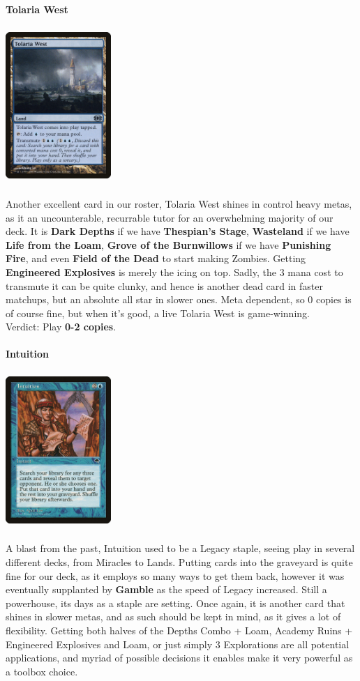 \documentclass{report}
\begin{document}
\textbf{Tolaria West}
\begin{center}
\includegraphics [width = 4cm, height = 6cm] {tolaria-west}
\end{center}
Another excellent card in our roster, Tolaria West shines in control heavy metas, as it an uncounterable, recurrable tutor for an overwhelming majority of our deck. It is \textbf{Dark Depths} if we have \textbf{Thespian's Stage}, \textbf{Wasteland} if we have \textbf{Life from the Loam}, \textbf{Grove of the Burnwillows} if we have \textbf{Punishing Fire}, and even \textbf{Field of the Dead} to start making Zombies. Getting \textbf{Engineered Explosives} is merely the icing on top. Sadly, the 3 mana cost to transmute it can be quite clunky, and hence is another dead card in faster matchups, but an absolute all star in slower ones. Meta dependent, so 0 copies is of course fine, but when it's good, a live Tolaria West is game-winning.\\
Verdict:  Play \textbf{0-2 copies}.\\\\
\newpage
\textbf{Intuition}
\begin{center}
\includegraphics [width = 4cm, height = 6cm] {intuition}
\end{center}
A blast from the past, Intuition used to be a Legacy staple, seeing play in several different decks, from Miracles to Lands. Putting cards into the graveyard is quite fine for our deck, as it employs so many ways to get them back, however it was eventually supplanted by \textbf{Gamble} as the speed of Legacy increased. Still a powerhouse, its days as a staple are setting. Once again, it is another card that shines in slower metas, and as such should be kept in mind, as it gives a lot of flexibility. Getting both halves of the Depths Combo +  Loam, Academy Ruins + Engineered Explosives and Loam, or just simply 3 Explorations are all potential applications, and myriad of possible decisions it enables make it very powerful as a toolbox choice.\\
\end{document}
